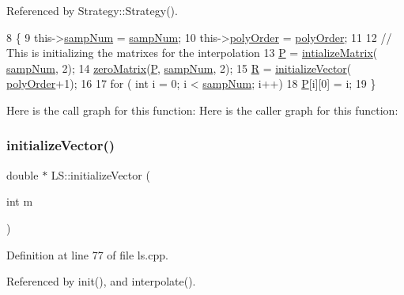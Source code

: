 Referenced by Strategy\+::\+Strategy().


\begin{DoxyCode}
8                                        \{
9     this->\hyperlink{class_l_s_a333c6e0be784cffd2f97f46803c5ba15}{sampNum}   = \hyperlink{class_l_s_a333c6e0be784cffd2f97f46803c5ba15}{sampNum};
10     this->\hyperlink{class_l_s_aecf61c51ef6717acc81b737e298e4236}{polyOrder} = \hyperlink{class_l_s_aecf61c51ef6717acc81b737e298e4236}{polyOrder};
11 
12   \textcolor{comment}{// This is initializing the matrixes for the interpolation}
13     \hyperlink{class_l_s_aef5aafb3950204592111d32c93721aa3}{P} = \hyperlink{class_l_s_a97eedf6376636d59fbe894909ab97ca0}{intializeMatrix}( \hyperlink{class_l_s_a333c6e0be784cffd2f97f46803c5ba15}{sampNum}, 2);
14     \hyperlink{class_l_s_a2825429a29497b5dbad69a8b77f42d00}{zeroMatrix}(\hyperlink{class_l_s_aef5aafb3950204592111d32c93721aa3}{P}, \hyperlink{class_l_s_a333c6e0be784cffd2f97f46803c5ba15}{sampNum}, 2);
15     \hyperlink{class_l_s_ade8c978a7d99f10950790c0dfec9f556}{R} = \hyperlink{class_l_s_a29b451ca9a328e9e5c73d32886441439}{initializeVector}( \hyperlink{class_l_s_aecf61c51ef6717acc81b737e298e4236}{polyOrder}+1);
16 
17     \textcolor{keywordflow}{for} ( \textcolor{keywordtype}{int} i = 0; i < \hyperlink{class_l_s_a333c6e0be784cffd2f97f46803c5ba15}{sampNum}; i++)
18         \hyperlink{class_l_s_aef5aafb3950204592111d32c93721aa3}{P}[i][0] = i;
19 \}
\end{DoxyCode}
Here is the call graph for this function\+:
Here is the caller graph for this function\+:
\mbox{\label{class_l_s_a29b451ca9a328e9e5c73d32886441439}} 
\subsubsection{\texorpdfstring{initialize\+Vector()}{initializeVector()}}
{\footnotesize\ttfamily double $\ast$ L\+S\+::initialize\+Vector (\begin{DoxyParamCaption}\item[{int}]{m }\end{DoxyParamCaption})\hspace{0.3cm}{\ttfamily [private]}}



Definition at line 77 of file ls.\+cpp.



Referenced by init(), and interpolate().


